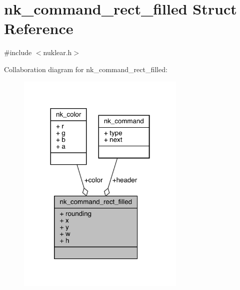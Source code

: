 \hypertarget{structnk__command__rect__filled}{}\section{nk\+\_\+command\+\_\+rect\+\_\+filled Struct Reference}
\label{structnk__command__rect__filled}


{\ttfamily \#include $<$nuklear.\+h$>$}



Collaboration diagram for nk\+\_\+command\+\_\+rect\+\_\+filled\+:
\nopagebreak
\begin{figure}[H]
\begin{center}
\leavevmode
\includegraphics[width=228pt]{structnk__command__rect__filled__coll__graph}
\end{center}
\end{figure}
